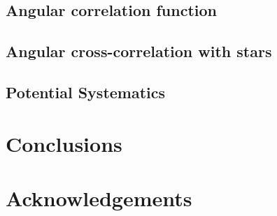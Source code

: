 \documentclass[fleqn,usenatbib]{mnras}
\newcommand{\mike}[1]{~\newline\noindent \textcolor{Green}{{ [Michael:~{#1}]\\}}}
\newcommand{\BGS}{\textsc{bgs}\xspace}
\newcommand{\GAMA}{\textsc{gama}\xspace}
\newcommand{\SDSS}{\textsc{sdss}\xspace}
\begin{document}
\subsection{Angular correlation function}
\subsection{Angular cross-correlation with stars}

\subsection{Potential Systematics}

\section{Conclusions}

\section*{Acknowledgements}
\end{document}
